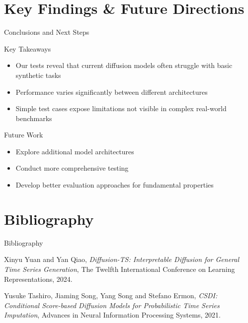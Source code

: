 \documentclass[8pt]{beamer}
\renewcommand{\|}{\ensuremath{\hspace{0.1cm} | \hspace{0.1cm}}}
\begin{document}
    \section{Key Findings \& Future Directions}
    \begin{frame}{Conclusions and Next Steps}

        \begin{block}{Key Takeaways}
        \begin{itemize}
            \item Our tests reveal that current diffusion models often struggle with basic synthetic tasks
            \item Performance varies significantly between different architectures
            \item Simple test cases expose limitations not visible in complex real-world benchmarks
        \end{itemize}
        \end{block}
        
        \vspace{0.4cm}
        
        \begin{alertblock}{Future Work}
        \begin{itemize}
            \item Explore additional model architectures
            \item Conduct more comprehensive testing
            \item Develop better evaluation approaches for fundamental properties
        \end{itemize}
        \end{alertblock}
        
    \end{frame}

    

    \section{Bibliography}
\begin{frame}{Bibliography}
    \begin{thebibliography}{99}
        Xinyu Yuan and Yan Qiao, 
        \textit{Diffusion-TS: Interpretable Diffusion for General Time Series Generation}, 
        The Twelfth International Conference on Learning Representations, 2024.
        
        Yusuke Tashiro, Jiaming Song, Yang Song and Stefano Ermon, 
        \textit{CSDI: Conditional Score-based Diffusion Models for Probabilistic Time Series Imputation}, 
        Advances in Neural Information Processing Systems, 2021.
    \end{thebibliography}
\end{frame}
\end{document}
